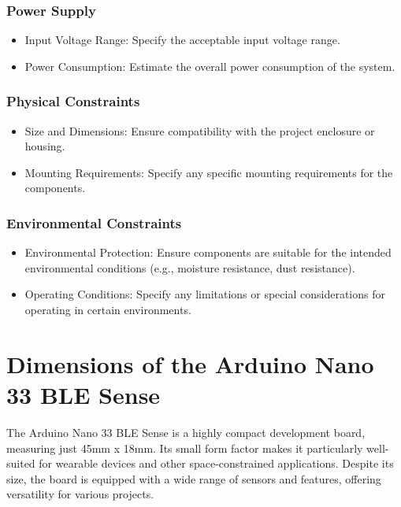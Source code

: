 \subsubsection*{Power Supply}
\begin{itemize}[label=--]
	\item Input Voltage Range: Specify the acceptable input voltage range.
	\item Power Consumption: Estimate the overall power consumption of the system.
\end{itemize}

\subsubsection*{Physical Constraints}
\begin{itemize}[label=--]
	\item Size and Dimensions: Ensure compatibility with the project enclosure or housing.
	\item Mounting Requirements: Specify any specific mounting requirements for the components.
\end{itemize}

\subsubsection*{Environmental Constraints}
\begin{itemize}[label=--]
	\item Environmental Protection: Ensure components are suitable for the intended environmental conditions (e.g., moisture resistance, dust resistance).
	\item Operating Conditions: Specify any limitations or special considerations for operating in certain environments.\cite{Arduino:2021}
\end{itemize}



\section{Dimensions of the Arduino Nano 33 BLE Sense}



The Arduino Nano 33 BLE Sense is a highly compact development board, measuring just 45mm x 18mm. Its small form factor makes it particularly well-suited for wearable devices and other space-constrained applications. Despite its size, the board is equipped with a wide range of sensors and features, offering versatility for various projects.

